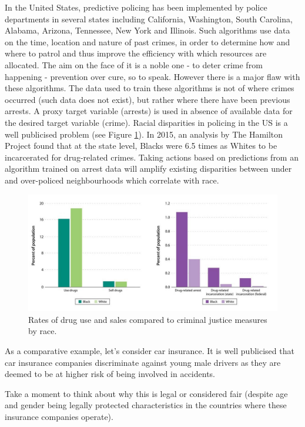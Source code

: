 In the United States, predictive policing has been implemented by police departments in several states including California, Washington, South Carolina, Alabama, Arizona, Tennessee, New York and Illinois. Such algorithms use data on the time, location and nature of past crimes, in order to determine how and where to patrol and thus improve the efficiency with which resources are allocated. The aim on the face of it is a noble one - to deter crime from happening - prevention over cure, so to speak. However there is a major flaw with these algorithms. The data used to train these algorithms is not of where crimes occurred (such data does not exist), but rather where there have been previous arrests. A proxy target variable (arrests) is used in absence of available data for the desired target variable (crime). Racial disparities in policing in the US is a well publicised problem (see Figure \ref{fig_drugs}). In 2015, an analysis by The Hamilton Project found that at the state level, Blacks were 6.5 times as Whites to be incarcerated for drug-related crimes\cite{HamProj}. Taking actions based on predictions from an algorithm trained on arrest data will amplify existing disparities between under and over-policed neighbourhoods which correlate with race.
%
\begin{figure}[h!]
\includegraphics[width=\textwidth]{02_EthicalDevelopment/figures/Fig_RatesDrugUseSaleRace.jpg}
\caption[Rates of drug use and sales compared to criminal justice measures by race.]{Rates of drug use and sales compared to criminal justice measures by race\cite{HamProj}.}
\label{fig_drugs}
\end{figure}

As a comparative example, let's consider car insurance. It is well publicised that car insurance companies discriminate against young male drivers as they are deemed to be at higher risk of being involved in accidents.
%
\begin{lookbox}
Take a moment to think about why this is legal or considered fair (despite age and gender being legally protected characteristics in the countries where these insurance companies operate).
\end{lookbox}

